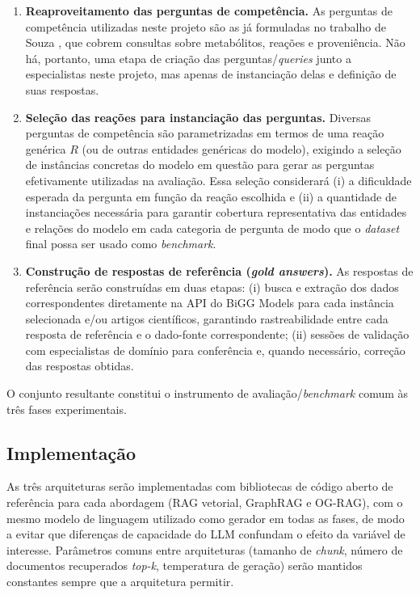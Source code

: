 \documentclass{article}
\begin{document}
\begin{enumerate}
	\item \textbf{Reaproveitamento das perguntas de competência.} As perguntas de competência utilizadas neste projeto são as já  formuladas no trabalho de Souza \cite{souza2025ontogem}, que cobrem consultas sobre metabólitos, reações e proveniência. Não há, portanto, uma etapa de criação das perguntas/\textit{queries} junto a especialistas neste projeto, mas apenas de instanciação delas e definição de suas respostas.
	\item \textbf{Seleção das reações para instanciação das perguntas.} Diversas perguntas de competência são parametrizadas em termos de uma reação genérica $R$ (ou de outras entidades genéricas do modelo), exigindo a seleção de instâncias concretas do modelo em questão para gerar as perguntas efetivamente utilizadas na avaliação. Essa seleção considerará (i) a dificuldade esperada da pergunta em função da reação escolhida e (ii) a quantidade de instanciações necessária para garantir cobertura representativa das entidades e relações do modelo em cada categoria de pergunta de modo que o \textit{dataset} final possa ser usado como \textit{benchmark}.
	\item \textbf{Construção de respostas de referência (\textit{gold answers}).} As respostas de referência serão construídas em duas etapas: (i) busca e extração dos dados correspondentes diretamente na API do BiGG Models para cada instância selecionada e/ou artigos científicos, garantindo rastreabilidade entre cada resposta de referência e o dado-fonte correspondente; (ii) sessões de validação com especialistas de domínio para conferência e, quando necessário, correção das respostas obtidas.
\end{enumerate}

O conjunto resultante constitui o instrumento de avaliação/\textit{benchmark} comum às três fases experimentais.

\subsection{Implementação}

As três arquiteturas serão implementadas com bibliotecas de código aberto de referência para cada abordagem (RAG vetorial, GraphRAG e OG-RAG), com o mesmo modelo de linguagem utilizado como gerador em todas as fases, de modo a evitar que diferenças de capacidade do LLM confundam o efeito da variável de interesse. Parâmetros comuns entre arquiteturas (tamanho de \textit{chunk}, número de documentos recuperados \textit{top-k}, temperatura de geração) serão mantidos constantes sempre que a arquitetura permitir.
\end{document}
